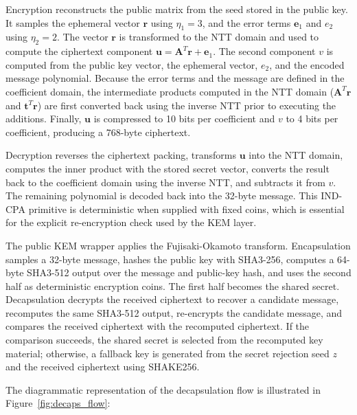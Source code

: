 Encryption reconstructs the public matrix from the seed stored in the public key. It samples the ephemeral vector $\mathbf{r}$ using $\eta_1=3$, and the error terms $\mathbf{e}_1$ and $e_2$ using $\eta_2=2$. The vector $\mathbf{r}$ is transformed to the NTT domain and used to compute the ciphertext component $\mathbf{u} = \mathbf{A}^T\mathbf{r} + \mathbf{e}_1$. The second component $v$ is computed from the public key vector, the ephemeral vector, $e_2$, and the encoded message polynomial. Because the error terms and the message are defined in the coefficient domain, the intermediate products computed in the NTT domain ($\mathbf{A}^T\mathbf{r}$ and $\mathbf{t}^T\mathbf{r}$) are first converted back using the inverse NTT prior to executing the additions. Finally, $\mathbf{u}$ is compressed to 10 bits per coefficient and $v$ to 4 bits per coefficient, producing a 768-byte ciphertext.

Decryption reverses the ciphertext packing, transforms $\mathbf{u}$ into the NTT domain, computes the inner product with the stored secret vector, converts the result back to the coefficient domain using the inverse NTT, and subtracts it from $v$. The remaining polynomial is decoded back into the 32-byte message. This IND-CPA primitive is deterministic when supplied with fixed coins, which is essential for the explicit re-encryption check used by the KEM layer.

The public KEM wrapper applies the Fujisaki-Okamoto transform. Encapsulation samples a 32-byte message, hashes the public key with SHA3-256, computes a 64-byte SHA3-512 output over the message and public-key hash, and uses the second half as deterministic encryption coins. The first half becomes the shared secret. Decapsulation decrypts the received ciphertext to recover a candidate message, recomputes the same SHA3-512 output, re-encrypts the candidate message, and compares the received ciphertext with the recomputed ciphertext. If the comparison succeeds, the shared secret is selected from the recomputed key material; otherwise, a fallback key is generated from the secret rejection seed $z$ and the received ciphertext using SHAKE256.

The diagrammatic representation of the decapsulation flow is illustrated in Figure~\ref{fig:decaps_flow}:

